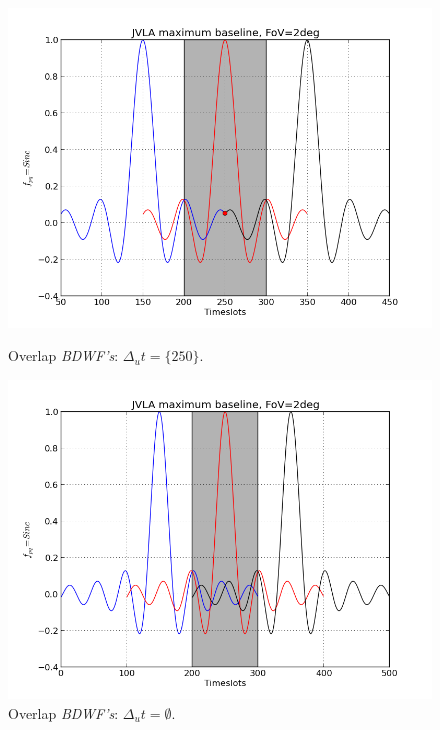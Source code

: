 \documentclass[useAMS,usenatbib]{mn2e}
\begin{document}
\begin{figure}
\begin{minipage}{0.38\linewidth}\includegraphics[width=1\textwidth]{./Figures/corrSigVLAMxBl.png}\caption{Overlap 
		\textit{BDWF's}: $\Delta_u t=\{250\}$.}\label{fig:corrSigVLAMxBl}\end{minipage}
  \hspace{1cm} 
\begin{minipage}{0.38\linewidth}\includegraphics[width=1\textwidth]{./Figures/corrSigVLAMxBl_overlapGdelta.png}\caption{Overlap 
		\textit{BDWF's}: $\Delta_u t=\emptyset$.}\label{fig:corrSigVLAMxBl_overlapGdelta}\end{minipage}
\end{figure}
\end{document}
